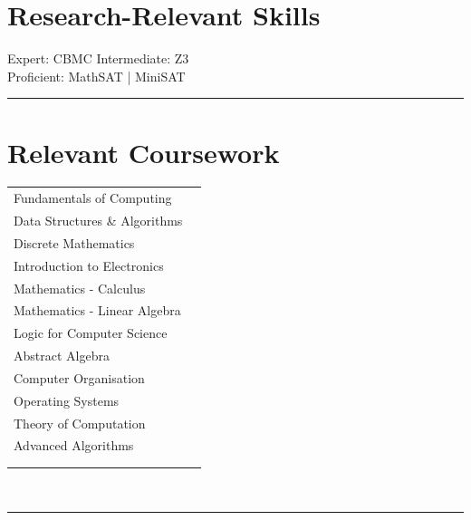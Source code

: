\documentclass[letterpaper]{Formatting}
\begin{document}
\begin{minipage}[t]{0.3\textwidth}

\section{Research-Relevant Skills}
Expert: CBMC \textbullet{} Intermediate: Z3\\\vspace{1em}
Proficient: MathSAT | MiniSAT
\sectionspace %
\vspace{-1.5ex}
\rule{5cm}{0.5pt}
\vspace{2ex}



\section{Relevant Coursework}
\begin{tabular}{lp{1cm}}
Fundamentals of Computing \\
Data Structures \& Algorithms \\
Discrete Mathematics \\
Introduction to Electronics \\
Mathematics - Calculus \\
Mathematics - Linear Algebra \\
Logic for Computer Science \\
Abstract Algebra \\
Computer Organisation \\
Operating Systems \\
Theory of Computation \\
Advanced Algorithms \\
\multicolumn{2}{c}{} \\ \\
\end{tabular}
\\
\sectionspace %
\vspace{-4.5ex}
\rule{5cm}{0.5pt}
\vspace{2ex}



\end{minipage}
\end{document}
